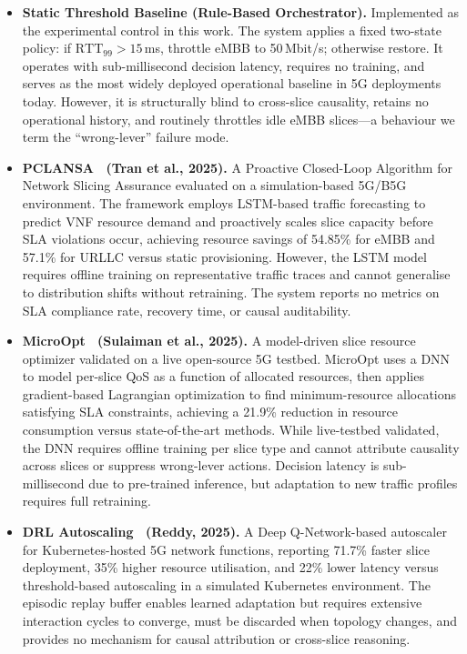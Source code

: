 \documentclass[12pt]{article}
\begin{document}
\begin{itemize}[leftmargin=*]

\item \textbf{Static Threshold Baseline (Rule-Based Orchestrator).}
Implemented as the experimental control in this work. The system applies a fixed
two-state policy: if $\text{RTT}_{99} > 15$\,ms, throttle eMBB to 50\,Mbit/s;
otherwise restore. It operates with sub-millisecond decision latency, requires no
training, and serves as the most widely deployed operational baseline in 5G
deployments today. However, it is structurally blind to cross-slice causality,
retains no operational history, and routinely throttles idle eMBB slices---a
behaviour we term the ``wrong-lever'' failure mode.

\item \textbf{PCLANSA~\cite{tran2025closed} (Tran et al., 2025).}
A Proactive Closed-Loop Algorithm for Network Slicing Assurance evaluated on a
simulation-based 5G/B5G environment. The framework employs LSTM-based traffic
forecasting to predict VNF resource demand and proactively scales slice capacity
before SLA violations occur, achieving resource savings of 54.85\% for eMBB and
57.1\% for URLLC versus static provisioning. However, the LSTM model requires
offline training on representative traffic traces and cannot generalise to
distribution shifts without retraining. The system reports no metrics on SLA
compliance rate, recovery time, or causal auditability.

\item \textbf{MicroOpt~\cite{sulaiman2024microopt} (Sulaiman et al., 2025).}
A model-driven slice resource optimizer validated on a live open-source 5G testbed.
MicroOpt uses a DNN to model per-slice QoS as a function of allocated resources,
then applies gradient-based Lagrangian optimization to find minimum-resource
allocations satisfying SLA constraints, achieving a 21.9\% reduction in resource
consumption versus state-of-the-art methods. While live-testbed validated, the
DNN requires offline training per slice type and cannot attribute causality across
slices or suppress wrong-lever actions. Decision latency is sub-millisecond due to
pre-trained inference, but adaptation to new traffic profiles requires full retraining.

\item \textbf{DRL Autoscaling~\cite{reddy2025drl} (Reddy, 2025).}
A Deep Q-Network-based autoscaler for Kubernetes-hosted 5G network functions,
reporting 71.7\% faster slice deployment, 35\% higher resource utilisation, and
22\% lower latency versus threshold-based autoscaling in a simulated Kubernetes
environment. The episodic replay buffer enables learned adaptation but requires
extensive interaction cycles to converge, must be discarded when topology changes,
and provides no mechanism for causal attribution or cross-slice reasoning.

\end{itemize}
\end{document}
